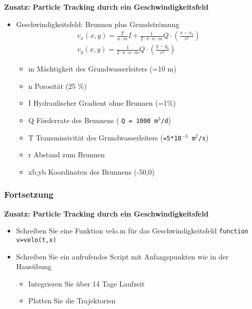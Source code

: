   \secMexercise
      \begin{frame}
          \frameMexercise
          \begin{exercise}
              \sloppy
              \textbf{Zusatz: Particle Tracking durch ein Geschwindigkeitsfeld}
              \begin{itemize}
               \item Geschwindigkeitsfeld: Brunnen plus Grundströmung
                 \begin{displaymath}
                   \begin{split}
                     v_{x}(x,y) = \frac{T}{n \cdot m}I+\frac{1}{2 \cdot \pi \cdot n \cdot m}Q \cdot \left( \frac{x-x_{b}}{r^{2}} \right) \\
         		     v_{y}(x,y) = \frac{1}{2 \cdot \pi \cdot n \cdot m}Q \cdot \left( \frac{y-y_{b}}{r^{2}} \right)
         		    \end{split}
                   \end{displaymath}
          
                  \begin{itemize}
					\item m	Mächtigkeit des Grundwasserleiters (=10 m)
					\item n	Porosität (25 \%)
					\item I	Hydraulischer Gradient ohne Brunnen (=1\%)
					\item Q	Förderrate des Brunnens ( \texttt{Q = 1000 m$^3$/d})
					\item T	Transmissivität des Grundwasserleiters (\texttt{=5*10$^{-3}$ m$^2$/s})
					\item r	Abstand zum Brunnen
					\item xb,yb Koordinaten des Brunnens (-50,0)
				  \end{itemize}

                \end{itemize}
          \end{exercise}
      \end{frame}
      
      \begin{frame}
		\frametitle{Fortsetzung}
          \begin{exercise}
              \sloppy          
              \textbf{Zusatz: Particle Tracking durch ein Geschwindigkeitsfeld}
              \begin{itemize}
                \item Schreiben Sie eine Funktion velo.m für das Geschwindigkeitsfeld
\texttt{function v=velo(t,x)}
				\item Schreiben Sie ein aufrufendes Script mit Anfangspunkten wie in der Hausübung 
				\begin{itemize}
					\item Integrieren Sie über 14 Tage Laufzeit
					\item Plotten Sie die Trajektorien
				\end{itemize}
              \end{itemize}
          \end{exercise}
      \end{frame}
      
